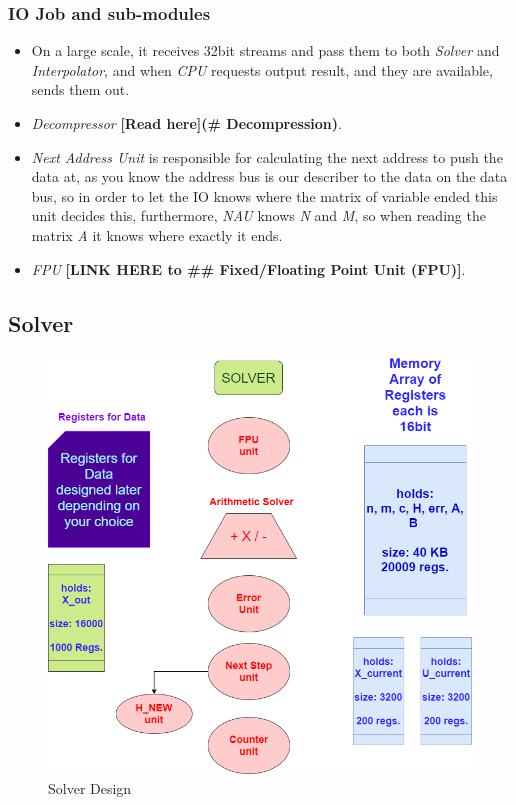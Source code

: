 \documentclass[12pt]{extarticle}
\begin{document}
\subsubsection{IO Job and sub-modules}

\begin{itemize}
    \item On a large scale, it receives 32bit streams and pass them to both \emph{Solver} and \emph{Interpolator}, and when \emph{CPU} requests output result, and they are available, sends them out.
    \item \emph{Decompressor} \textbf{[Read here](\# Decompression)}.
    \item \emph{Next Address Unit} is responsible for calculating the next address to push the data at, as you know the address bus is our describer to the data on the data bus, so in order to let the IO knows where the matrix of variable ended this unit decides this, furthermore, \emph{NAU} knows \emph{N} and \emph{M}, so when reading the matrix \emph{A} it knows where exactly it ends.
    \item \emph{FPU} \textbf{[LINK HERE to \#\# Fixed/Floating Point Unit (FPU)]}.
\end{itemize}

\subsection{Solver}

\begin{figure}[hp]
    \centering
    \includegraphics[width=\textwidth]{solver}
    \caption{Solver Design}
    \label{fig:solver}
\end{figure}
\end{document}
